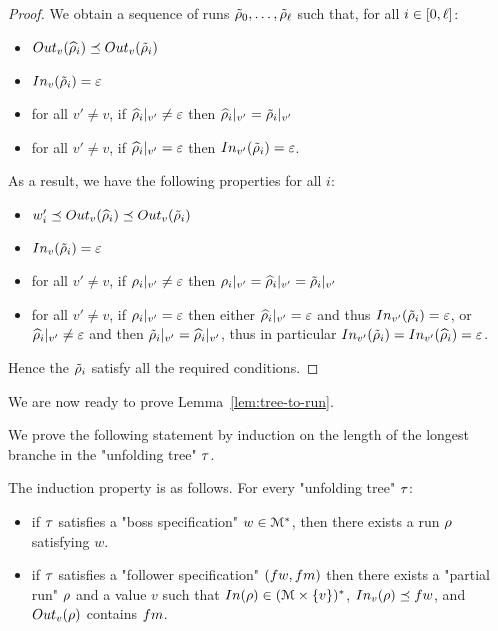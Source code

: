 \begin{proof}
We obtain a sequence of runs $\Tilde{\run}_0, \ldots, \Tilde{\run}_\ell$ such that, for all $i\in\nset{0}{\ell}$:
\begin{itemize}
	\item $\voutput{v}{\widehat{\run}_i} \subword \voutput{v}{\Tilde{\run}_i}$
	
	\item $\vinput{v}{\Tilde{\run}_i} = \epsilon$
	
	\item for all $v' \neq v$, if $\vproj{v'}{\widehat{\run}_i} \neq \epsilon$ then $\vproj{v'}{\widehat{\run}_i} = \vproj{v'}{\Tilde{\run}_i}$
	
	\item for all $v' \neq v$, if $\vproj{v'}{\widehat{\run}_i} = \epsilon$ then  $\vinput{v'}{\Tilde{\run}_i} = \epsilon$.
\end{itemize}

As a result, we have the following properties for all $i$:
\begin{itemize}
	\item $w'_i \subword \voutput{v}{\widehat{\run}_i} \subword \voutput{v}{\Tilde{\run}_i}$
	
	\item $\vinput{v}{\Tilde{\run}_i} = \epsilon$
	
	\item for all $v' \neq v$, if $\vproj{v'}{\run_i} \neq \epsilon$ then $\vproj{v'}{\run_i} = \vproj{v'}{\widehat{\run}_i} = \vproj{v'}{\Tilde{\run}_i}$
	
	\item for all $v' \neq v$, if $\vproj{v'}{\run_i} = \epsilon$ then either $\vproj{v'}{\widehat{\run}_i} = \epsilon$ and thus $\vinput{v'}{\Tilde{\run}_i} = \epsilon$, or $\vproj{v'}{\widehat{\run}_i} \neq \epsilon$ and then $\vproj{v'}{\Tilde{\run}_i} = \vproj{v'}{\widehat{\run}_i}$, thus in particular $\vinput{v'}{\Tilde{\run}_i} = \vinput{v'}{\widehat{\run}_i} = \epsilon$. 
\end{itemize}

Hence the $\Tilde{\run}_i$ satisfy all the required conditions.
\end{proof}

We are now ready to prove Lemma~\ref{lem:tree-to-run}.

\LemTreeToRun*


	We prove the following statement by induction on the length of the longest branche in the "unfolding tree" $\tree$.  
	
	The induction property is as follows. For every "unfolding tree" $\tree$:
	\begin{itemize}
		\item if $\tree$ satisfies a "boss specification" $w \in \messages^*$, then there exists a run $\run$ satisfying $w$.
		\item if $\tree$ satisfies a "follower specification" $(\followwordspec, \followmessagespec)$ then there exists a "partial run" $\run$ and a value $v$ such that $\Input{\run} \in (\messages\times \set{v})^*$, $\vinput{v}{\run} \subword \followwordspec$, and $\voutput{v}{\run}$ contains $\followmessagespec$.
	\end{itemize}
	

